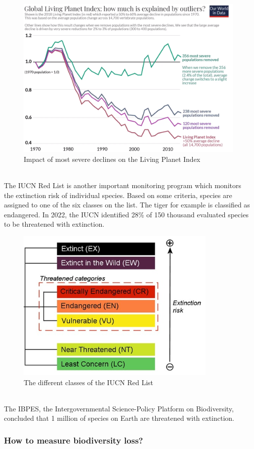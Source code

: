 \documentclass[../summary.tex]{subfiles}
\begin{document}
\begin{figure}[H]
	\centering
	\includegraphics[width=0.8\linewidth]{../images/LPI}
	\caption{Impact of most severe declines on the Living Planet Index}
	\label{fig:lpi}
\end{figure}
\ \\
The IUCN Red List is another important monitoring program which monitors the extinction risk of individual species. Based on some criteria, species are assigned to one of the six classes on the list. The tiger for example is classified as endangered. In 2022, the IUCN identified 28\% of 150 thousand evaluated species to be threatened with extinction. 

\begin{figure}[H]
	\centering
	\includegraphics[width=0.6\linewidth]{../images/IUCN}
	\caption{The different classes of the IUCN Red List}
	\label{fig:iucn}
\end{figure}
\ \\
The IBPES, the Intergovernmental Science-Policy Platform on Biodiversity, concluded that 1 million of species on Earth are threatened with extinction.

\subsubsection{How to measure biodiversity loss?}
\end{document}
